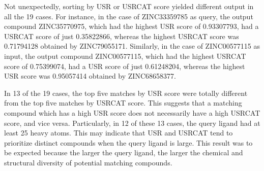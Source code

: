 Not unexpectedly, sorting by USR or USRCAT score yielded different output in all the 19 cases. For instance, in the case of ZINC33359785 as query, the output compound ZINC35770975, which had the highest USR score of 0.93307793, had a USRCAT score of just 0.35822866, whereas the highest USRCAT score was 0.71794128 obtained by ZINC79055171. Similarly, in the case of ZINC00577115 as input, the output compound ZINC00577115, which had the highest USRCAT score of 0.75399074, had a USR score of just 0.61248204, whereas the highest USR score was 0.95057414 obtained by ZINC68658377.

In 13 of the 19 cases, the top five matches by USR score were totally different from the top five matches by USRCAT score. This suggests that a matching compound which has a high USR score does not necessarily have a high USRCAT score, and vice versa. Particularly, in 12 of these 13 cases, the query ligand had at least 25 heavy atoms. This may indicate that USR and USRCAT tend to prioritize distinct compounds when the query ligand is large. This result was to be expected because the larger the query ligand, the larger the chemical and structural diversity of potential matching compounds.

